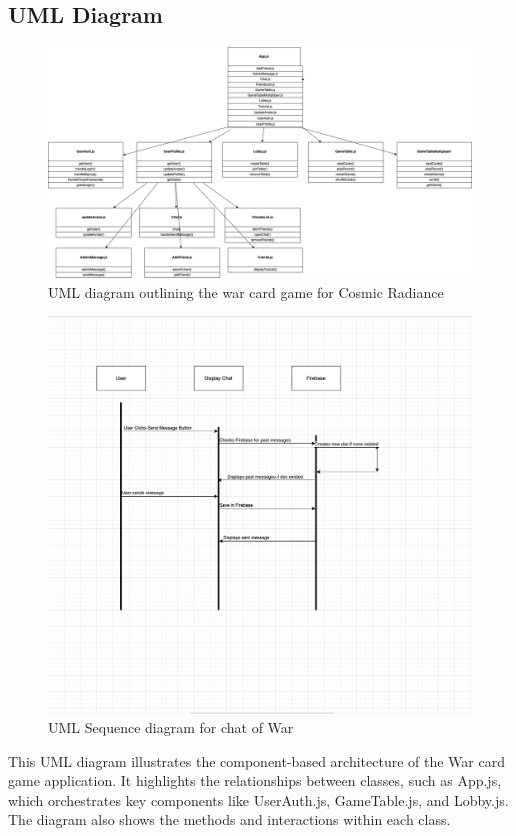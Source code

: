 \subsection{UML Diagram}
\begin{figure}
    \centering
    \includegraphics[width=1\linewidth]{figures/finalUML.png}
    \caption{UML diagram outlining the war card game for Cosmic Radiance}
    \label{fig:enter-label}
\end{figure}

\begin{figure}
    \centering
    \includegraphics[width=1\linewidth]{documentation/figures/Sequence UML .png}
    \caption{UML Sequence diagram for chat of War}
    \label{fig:enter-label}
\end{figure}

This UML diagram illustrates the component-based architecture of the War card game application. It highlights the relationships between classes, such as App.js, which orchestrates key components like UserAuth.js, GameTable.js, and Lobby.js. The diagram also shows the methods and interactions within each class.




